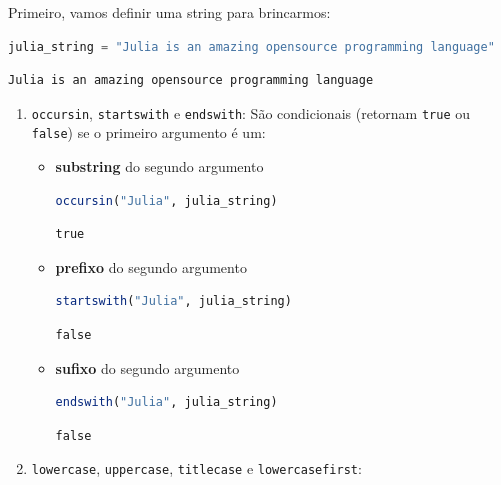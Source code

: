 \documentclass[
  notoc %
]{tufte-book}
\newcommand{\passthrough}[1]{#1}
\begin{document}
Primeiro, vamos definir uma string para brincarmos:

\begin{lstlisting}[language=Julia]
julia_string = "Julia is an amazing opensource programming language"
\end{lstlisting}

\begin{lstlisting}[language=Output]
Julia is an amazing opensource programming language
\end{lstlisting}

\begin{enumerate}
\def\labelenumi{\arabic{enumi}.}
\item
  \passthrough{\lstinline!occursin!},
  \passthrough{\lstinline!startswith!} e
  \passthrough{\lstinline!endswith!}: São condicionais (retornam
  \passthrough{\lstinline!true!} ou \passthrough{\lstinline!false!}) se
  o primeiro argumento é um:

  \begin{itemize}
  \item
    \textbf{substring} do segundo argumento

    \begin{lstlisting}[language=Julia]
    occursin("Julia", julia_string)
    \end{lstlisting}

    \begin{lstlisting}[language=Output]
    true
    \end{lstlisting}
  \item
    \textbf{prefixo} do segundo argumento

    \begin{lstlisting}[language=Julia]
    startswith("Julia", julia_string)
    \end{lstlisting}

    \begin{lstlisting}[language=Output]
    false
    \end{lstlisting}
  \item
    \textbf{sufixo} do segundo argumento

    \begin{lstlisting}[language=Julia]
    endswith("Julia", julia_string)
    \end{lstlisting}

    \begin{lstlisting}[language=Output]
    false
    \end{lstlisting}
  \end{itemize}
\item
  \passthrough{\lstinline!lowercase!},
  \passthrough{\lstinline!uppercase!},
  \passthrough{\lstinline!titlecase!} e
  \passthrough{\lstinline!lowercasefirst!}:


\end{enumerate}
\end{document}
